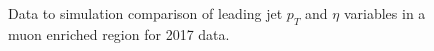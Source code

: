 \begin{figure}[htbp]
    \begin{center}
        \caption{Data to simulation comparison of leading jet $p_T$ and $\eta$ variables in a muon enriched region for 2017 data.}
        \label{fig:obj_jet}
    \end{center}
  \end{figure}




